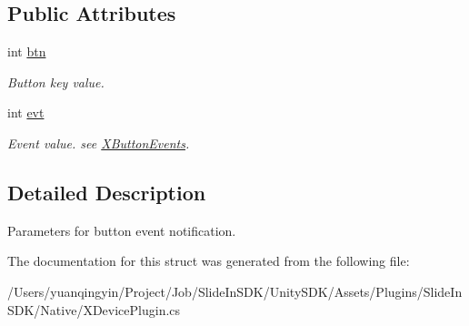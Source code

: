 \subsection*{Public Attributes}
\begin{DoxyCompactItemize}
\item 
\mbox{\label{struct_ximmerse_1_1_input_system_1_1_x_device_plugin_1_1_x_button_event_param_a2b9f845a00595703ede0cf328f5c84a2}} 
int \mbox{\hyperlink{struct_ximmerse_1_1_input_system_1_1_x_device_plugin_1_1_x_button_event_param_a2b9f845a00595703ede0cf328f5c84a2}{btn}}
\begin{DoxyCompactList}\small\item\em Button key value. \end{DoxyCompactList}\item 
\mbox{\label{struct_ximmerse_1_1_input_system_1_1_x_device_plugin_1_1_x_button_event_param_a1884c4954136a72ff657fe35c4f0e43b}} 
int \mbox{\hyperlink{struct_ximmerse_1_1_input_system_1_1_x_device_plugin_1_1_x_button_event_param_a1884c4954136a72ff657fe35c4f0e43b}{evt}}
\begin{DoxyCompactList}\small\item\em Event value. see \mbox{\hyperlink{class_ximmerse_1_1_input_system_1_1_x_device_plugin_a2b1a55b2bd1c82176239be06b2837a36}{X\+Button\+Events}}. \end{DoxyCompactList}\end{DoxyCompactItemize}


\subsection{Detailed Description}
Parameters for button event notification. 

The documentation for this struct was generated from the following file\+:\begin{DoxyCompactItemize}
\item 
/\+Users/yuanqingyin/\+Project/\+Job/\+Slide\+In\+S\+D\+K/\+Unity\+S\+D\+K/\+Assets/\+Plugins/\+Slide\+In\+S\+D\+K/\+Native/X\+Device\+Plugin.\+cs\end{DoxyCompactItemize}
